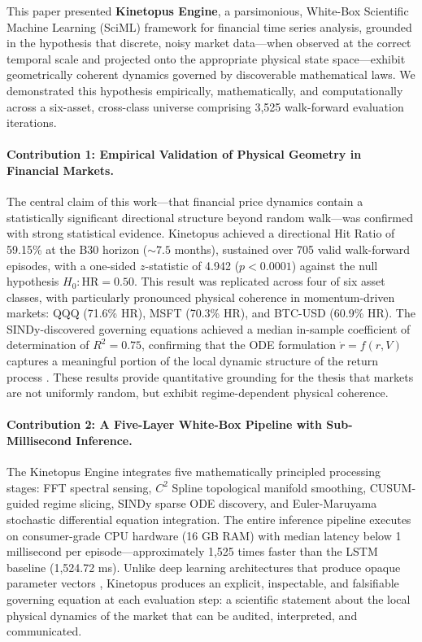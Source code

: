 \documentclass[11pt,a4paper]{article}
\begin{document}
This paper presented \textbf{Kinetopus Engine}, a parsimonious, White-Box Scientific Machine Learning (SciML) framework for financial time series analysis, grounded in the hypothesis that discrete, noisy market data---when observed at the correct temporal scale and projected onto the appropriate physical state space---exhibit geometrically coherent dynamics governed by discoverable mathematical laws. We demonstrated this hypothesis empirically, mathematically, and computationally across a six-asset, cross-class universe comprising 3,525 walk-forward evaluation iterations.

\paragraph{Contribution 1: Empirical Validation of Physical Geometry in Financial Markets.}
The central claim of this work---that financial price dynamics contain a statistically significant directional structure beyond random walk---was confirmed with strong statistical evidence. Kinetopus achieved a directional Hit Ratio of 59.15\% at the B30 horizon ($\sim 7.5$ months), sustained over 705 valid walk-forward episodes, with a one-sided $z$-statistic of 4.942 ($p < 0.0001$) against the null hypothesis $H_0: \text{HR} = 0.50$. This result was replicated across four of six asset classes, with particularly pronounced physical coherence in momentum-driven markets: QQQ (71.6\% HR), MSFT (70.3\% HR), and BTC-USD (60.9\% HR). The SINDy-discovered governing equations achieved a median in-sample coefficient of determination of $R^2 = 0.75$, confirming that the ODE formulation $\dot{r} = f(r, V)$ captures a meaningful portion of the local dynamic structure of the return process \cite{brunton2016discovering}. These results provide quantitative grounding for the thesis that markets are not uniformly random, but exhibit regime-dependent physical coherence.

\paragraph{Contribution 2: A Five-Layer White-Box Pipeline with Sub-Millisecond Inference.}
The Kinetopus Engine integrates five mathematically principled processing stages: FFT spectral sensing, $C^2$ Spline topological manifold smoothing, CUSUM-guided regime slicing, SINDy sparse ODE discovery, and Euler-Maruyama stochastic differential equation integration. The entire inference pipeline executes on consumer-grade CPU hardware (16 GB RAM) with median latency below 1 millisecond per episode---approximately 1,525 times faster than the LSTM baseline (1,524.72 ms). Unlike deep learning architectures that produce opaque parameter vectors \cite{hochreiter1997long}, Kinetopus produces an explicit, inspectable, and falsifiable governing equation at each evaluation step: a scientific statement about the local physical dynamics of the market that can be audited, interpreted, and communicated.
\end{document}
